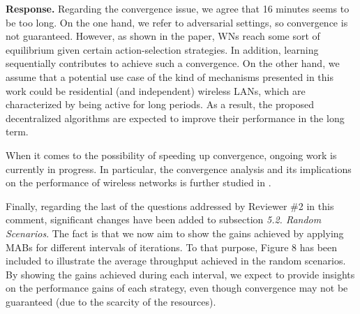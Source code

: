\documentclass[a4paper,twoside,11pt]{reviewresponse}
\begin{document}

\textbf{Response.} Regarding the convergence issue, we agree that 16 minutes seems to be too long. On the one hand, we refer to adversarial settings, so convergence is not guaranteed. However, as shown in the paper, WNs reach some sort of equilibrium given certain action-selection strategies. In addition, learning sequentially contributes to achieve such a convergence. On the other hand, we assume that a potential use case of the kind of mechanisms presented in this work could be residential (and independent) wireless LANs, which are characterized by being active for long periods. As a result, the proposed decentralized algorithms are expected to improve their performance in the long term.

When it comes to the possibility of speeding up convergence, ongoing work is currently in progress. In particular, the convergence analysis and its implications on the performance of wireless networks is further studied in \cite{wilhelmi2018potential}. 

Finally, regarding the last of the questions addressed by Reviewer \#2 in this comment, significant changes have been added to subsection \textit{5.2. Random Scenarios}. The fact is that we now aim to show the gains achieved by applying MABs for different intervals of iterations. To that purpose, Figure 8 has been included to illustrate the average throughput achieved in the random scenarios. By showing the gains achieved during each interval, we expect to provide insights on the performance gains of each strategy, even though convergence may not be guaranteed (due to the scarcity of the resources).

\end{document}
